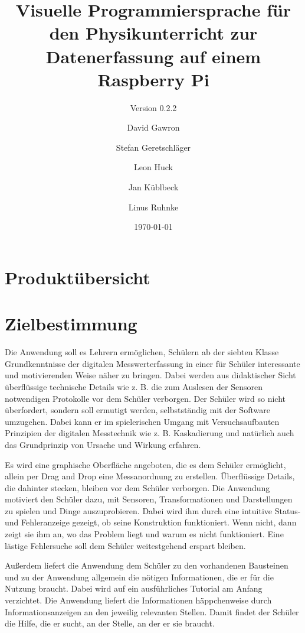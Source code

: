 \documentclass[parskip=full]{scrartcl}
\title{Visuelle Programmiersprache für den Physikunterricht zur Datenerfassung auf einem Raspberry Pi}
\subtitle{Version 0.2.2}
\author{David Gawron \and Stefan Geretschläger \and Leon Huck \and Jan Küblbeck \and Linus Ruhnke}
\date{\today}
\begin{document}
\maketitle

\newpage
\tableofcontents 					%
\newpage

\section{Produktübersicht}



\section{Zielbestimmung}

Die Anwendung soll es Lehrern ermöglichen, Schülern ab der siebten Klasse Grundkenntnisse der digitalen Messwerterfassung in einer für Schüler interessante und motivierenden Weise näher zu bringen. 
Dabei werden aus didaktischer Sicht überflüssige technische Details wie z. B. die zum Auslesen der Sensoren notwendigen Protokolle vor dem Schüler verborgen.
Der Schüler wird so nicht überfordert, sondern soll ermutigt werden, selbstständig mit der Software umzugehen. 
Dabei kann er im spielerischen Umgang mit Versuchsaufbauten Prinzipien der digitalen Messtechnik wie z. B. Kaskadierung und natürlich auch das Grundprinzip von Ursache und Wirkung erfahren.

Es wird eine graphische Oberfläche angeboten, die es dem Schüler ermöglicht, allein per Drag and Drop eine Messanordnung zu erstellen. 
Überflüssige Details, die dahinter stecken, bleiben vor dem Schüler verborgen.
Die Anwendung motiviert den Schüler dazu, mit Sensoren, Transformationen und Darstellungen zu spielen und Dinge auszuprobieren. 
Dabei wird ihm durch eine intuitive Status- und Fehleranzeige gezeigt, ob seine Konstruktion funktioniert. 
Wenn nicht, dann zeigt sie ihm an, wo das Problem liegt und warum es nicht funktioniert. 
Eine lästige Fehlersuche soll dem Schüler weitestgehend erspart bleiben. 

Außerdem liefert die Anwendung dem Schüler zu den vorhandenen Bausteinen und zu der Anwendung allgemein die nötigen Informationen, die er für die Nutzung braucht. Dabei wird auf ein ausführliches Tutorial am Anfang verzichtet. Die Anwendung liefert die Informationen häppchenweise durch Informationsanzeigen an den jeweilig relevanten Stellen. Damit findet der Schüler die Hilfe, die er sucht, an der Stelle, an der er sie braucht.
\end{document}
